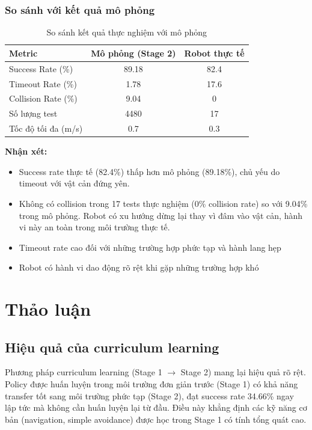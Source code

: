 \subsubsection{So sánh với kết quả mô phỏng}

\begin{table}[H]
\centering
\caption{So sánh kết quả thực nghiệm với mô phỏng}
\label{tab:sim_vs_real}
\begin{tabular}{lcc}
\hline
\textbf{Metric} & \textbf{Mô phỏng (Stage 2)} & \textbf{Robot thực tế} \\
\hline
Success Rate (\%) & 89.18 & 82.4 \\
Timeout Rate (\%) & 1.78 & 17.6 \\
Collision Rate (\%) & 9.04 & 0 \\
Số lượng test & 4480 & 17 \\
Tốc độ tối đa (m/s) & 0.7 & 0.3 \\
\hline
\end{tabular}
\end{table}

\textbf{Nhận xét:}
\begin{itemize}[nosep]
\item Success rate thực tế (82.4\%) thấp hơn mô phỏng (89.18\%), chủ yếu do timeout với vật cản đứng yên.
\item Không có collision trong 17 tests thực nghiệm (0\% collision rate) so với 9.04\% trong mô phỏng. Robot có xu hướng dừng lại thay vì đâm vào vật cản, hành vi này an toàn trong môi trường thực tế.
\item Timeout rate cao đối với những trường hợp phức tạp và hành lang hẹp
\item Robot có hành vi dao động rõ rệt khi gặp những trường hợp khó
\end{itemize}

\section{Thảo luận}
\label{sec:discussion}

\subsection{Hiệu quả của curriculum learning}

Phương pháp curriculum learning (Stage 1 $\rightarrow$ Stage 2) mang lại hiệu quả rõ rệt. Policy được huấn luyện trong môi trường đơn giản trước (Stage 1) có khả năng transfer tốt sang môi trường phức tạp (Stage 2), đạt success rate 34.66\% ngay lập tức mà không cần huấn luyện lại từ đầu. Điều này khẳng định các kỹ năng cơ bản (navigation, simple avoidance) được học trong Stage 1 có tính tổng quát cao.

